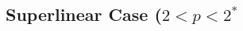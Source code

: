 \documentclass[11pt]{article}
\newcommand{\om} {\Omega}
\newcommand{\X}{\mathcal{X}_0} %
\begin{document}



\subsection{Superlinear Case (\texorpdfstring{$2 < p < 2^*$})}\label{sec:superlinear}
\end{document}

